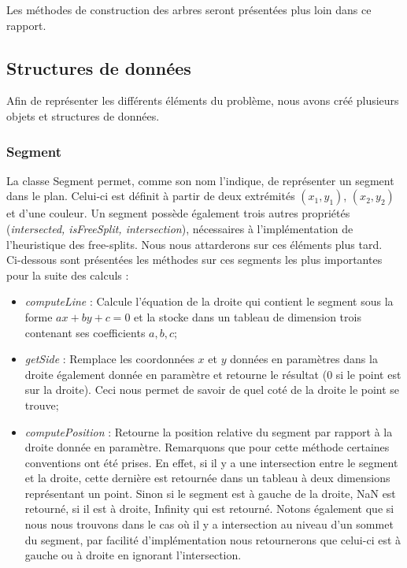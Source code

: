 \documentclass[11pt,a4paper]{article}
\theoremstyle{definition}
\theoremstyle{remark}
\begin{document}
Les méthodes de construction des arbres seront présentées plus loin dans ce rapport.

\subsection{Structures de données}
Afin de représenter les différents éléments du problème, nous avons créé plusieurs objets et structures de données.

\subsubsection{Segment}
La classe Segment permet, comme son nom l'indique, de représenter un segment dans le plan. Celui-ci est définit à partir de deux extrémités $(x_1,y_1)$, $(x_2,y_2)$ et d'une couleur. Un segment possède également trois autres propriétés (\emph{intersected, isFreeSplit, intersection}), nécessaires à l'implémentation de l'heuristique des free-splits. Nous nous attarderons sur ces éléments plus tard. \\

Ci-dessous sont présentées les méthodes sur ces segments les plus importantes pour la suite des calculs :\\

\begin{itemize}
\item \emph{computeLine} : Calcule l'équation de la droite qui contient le segment sous la forme $ax + by + c = 0$ et la stocke dans un tableau de dimension trois contenant ses coefficients $a,b,c$;
\item \emph{getSide} : Remplace les coordonnées $x$ et $y$ données en paramètres dans la droite également donnée en paramètre et retourne le résultat (0 si le point est sur la droite). Ceci nous permet de savoir de quel coté de la droite le point se trouve;
\item \emph{computePosition} : Retourne la position relative du segment par rapport à la droite donnée en paramètre. Remarquons que pour cette méthode certaines conventions ont été prises. En effet, si il y a une intersection entre le segment et la droite, cette dernière est retournée dans un tableau à deux dimensions représentant un point. Sinon si le segment est à gauche de la droite, NaN est retourné, si il est à droite, Infinity qui est retourné. Notons également que si nous nous trouvons dans le cas où il y a intersection au niveau d'un sommet du segment, par facilité d'implémentation nous retournerons que celui-ci est à gauche ou à droite en ignorant l'intersection.
\end{itemize}
\end{document}
